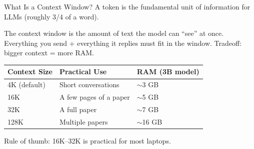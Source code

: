 \documentclass[aspectratio=169]{beamer}
\begin{document}
\begin{frame}{What Is a Context Window?}
    A token is the fundamental unit of information for LLMs (roughly 3/4 of a word).

    \vspace{0.5em}
    The context window is the amount of text the model can ``see'' at once. Everything you send + everything it replies must fit in the window. Tradeoff: bigger context = more RAM.

    \vspace{0.5em}
    \begin{table}
        \centering
        \begin{tabular}{lll}
            \toprule
            \textbf{Context Size} & \textbf{Practical Use} & \textbf{RAM (3B model)} \\
            \midrule
            4K (default)  & Short conversations        & $\sim$3 GB \\
            16K           & A few pages of a paper      & $\sim$5 GB \\
            32K           & A full paper                & $\sim$7 GB \\
            128K          & Multiple papers             & $\sim$16 GB \\
            \bottomrule
        \end{tabular}
    \end{table}

    \vspace{0.3em}
    Rule of thumb: 16K--32K is practical for most laptops.
\end{frame}
\end{document}
